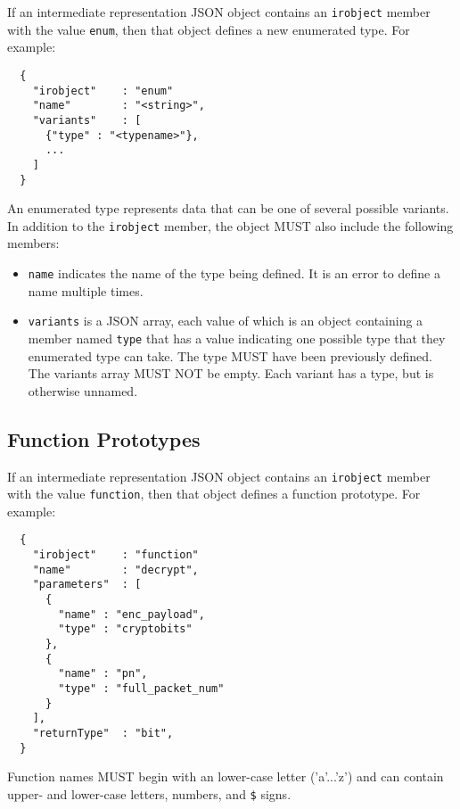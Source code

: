 \documentclass[twocolumn,a4paper]{article}
\begin{document}
If an intermediate representation JSON object contains an \texttt{irobject}
member with the value \texttt{enum}, then that object defines a new enumerated
type. For example:

\begin{verbatim}
  {
    "irobject"    : "enum"
    "name"        : "<string>",
    "variants"    : [
      {"type" : "<typename>"},
      ...
    ]
  }
\end{verbatim}

An enumerated type represents data that can be one of several possible
variants. In addition to the \texttt{irobject} member, the object MUST
also include the following members:
\begin{itemize}
  \item \texttt{name} indicates the name of the type being defined. It is
    an error to define a name multiple times.
  \item \texttt{variants} is a JSON array, each value of which is an object
    containing a member named \texttt{type} that has a value indicating one
    possible type that they enumerated type can take. The type MUST have
    been previously defined.  The variants array MUST NOT be empty. Each
    variant has a type, but is otherwise unnamed.
\end{itemize}

\subsection{Function Prototypes}
\label{sec:funcs}

If an intermediate representation JSON object contains an \texttt{irobject}
member with the value \texttt{function}, then that object defines a function
prototype. For example:

\begin{verbatim}
  {
    "irobject"    : "function"
    "name"        : "decrypt",
    "parameters"  : [
      {
        "name" : "enc_payload",
        "type" : "cryptobits"
      },
      {
        "name" : "pn",
        "type" : "full_packet_num"
      }
    ],
    "returnType"  : "bit",
  }
\end{verbatim}

Function names MUST begin with an lower-case letter ('a'...'z') and can contain
upper- and lower-case letters, numbers, and \verb|$| signs.

\end{document}
